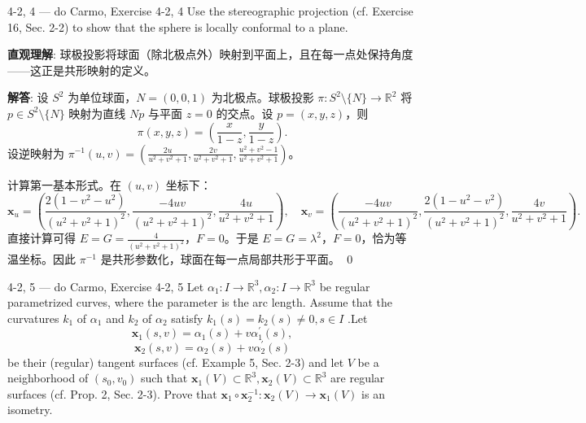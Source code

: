 \begin{exercise}{4-2, 4 — do Carmo, Exercise 4-2, 4}
Use the stereographic projection (cf. Exercise 16, Sec. 2-2) to show that the sphere is locally conformal to a plane.
\end{exercise}

\begin{solution}
\textbf{直观理解}: 球极投影将球面（除北极点外）映射到平面上，且在每一点处保持角度——这正是共形映射的定义。

\textbf{解答}: 设 $S^2$ 为单位球面，$N=(0,0,1)$ 为北极点。球极投影 $\pi: S^2\setminus\{N\}\to\mathbb{R}^2$ 将 $p\in S^2\setminus\{N\}$ 映射为直线 $Np$ 与平面 $z=0$ 的交点。设 $p=(x,y,z)$，则
\[
\pi(x,y,z) = \left(\frac{x}{1-z},\frac{y}{1-z}\right).
\]
设逆映射为 $\pi^{-1}(u,v) = \left(\frac{2u}{u^2+v^2+1},\frac{2v}{u^2+v^2+1},\frac{u^2+v^2-1}{u^2+v^2+1}\right)$。

计算第一基本形式。在 $(u,v)$ 坐标下：
\[
\mathbf{x}_u = \left(\frac{2(1-v^2-u^2)}{(u^2+v^2+1)^2},\frac{-4uv}{(u^2+v^2+1)^2},\frac{4u}{u^2+v^2+1}\right),\quad
\mathbf{x}_v = \left(\frac{-4uv}{(u^2+v^2+1)^2},\frac{2(1-u^2-v^2)}{(u^2+v^2+1)^2},\frac{4v}{u^2+v^2+1}\right).
\]
直接计算可得 $E=G=\frac{4}{(u^2+v^2+1)^2}$，$F=0$。于是 $E=G=\lambda^2$，$F=0$，恰为等温坐标。因此 $\pi^{-1}$ 是共形参数化，球面在每一点局部共形于平面。
\qed
\end{solution}

\begin{exercise}{4-2, 5 — do Carmo, Exercise 4-2, 5}
Let $\alpha_{1}\colon I\to \mathbb{R}^{3},\alpha_{2}\colon I\to \mathbb{R}^{3}$ be regular parametrized curves, where the parameter is the arc length. Assume that the curvatures $k_{1}$ of $\alpha_{1}$ and $k_{2}$ of $\alpha_{2}$ satisfy $k_{1}(s) = k_{2}(s)\neq 0,s\in I$ .Let
\[
\mathbf {x} _ {1} (s, v) = \alpha_ {1} (s) + v \alpha_ {1} ^ {\prime} (s),
\]
\[
\mathbf {x} _ {2} (s, v) = \alpha_ {2} (s) + v \alpha_ {2} ^ {\prime} (s)
\]
be their (regular) tangent surfaces (cf. Example 5, Sec. 2-3) and let $V$ be a neighborhood of $(s_0,v_0)$ such that $\mathbf{x}_1(V)\subset \mathbb{R}^3,\mathbf{x}_2(V)\subset \mathbb{R}^3$ are regular surfaces (cf. Prop. 2, Sec. 2-3). Prove that $\mathbf{x}_1\circ \mathbf{x}_2^{-1}\colon \mathbf{x}_2(V)\to \mathbf{x}_1(V)$ is an isometry.
\end{exercise}

